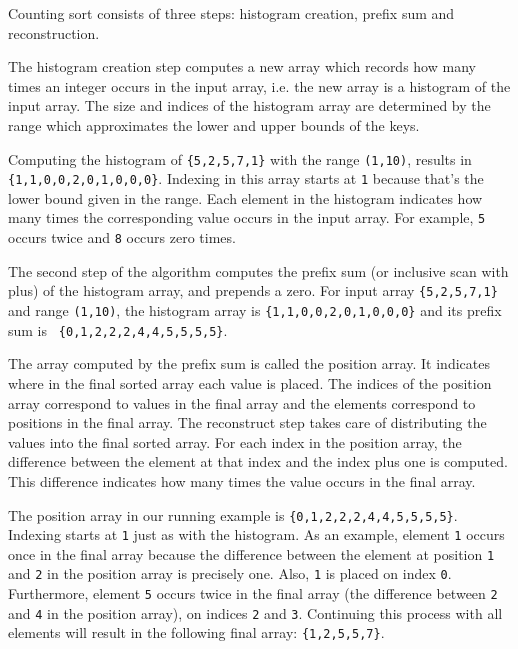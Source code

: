Counting sort consists of three steps: histogram creation, prefix sum
and reconstruction.

The histogram creation step computes a new array which records how
many times an integer occurs in the input array, i.e. the new array is
a histogram of the input array. The size and indices of the histogram
array are determined by the range which approximates the lower and
upper bounds of the keys.

Computing the histogram of \verb!{5,2,5,7,1}! with the range \verb!(1,10)!, 
results in \verb!{1,1,0,0,2,0,1,0,0,0}!.
Indexing in this array
starts at \verb!1! because that's the lower bound given in the
range. Each element in the histogram indicates how many times the
corresponding value occurs in the input array. For example, \verb!5!
occurs twice and \verb!8! occurs zero times.

The second step of the algorithm computes the prefix sum (or inclusive
scan with plus) of the histogram array, and prepends a zero.  For input array
\verb!{5,2,5,7,1}!  and range \verb!(1,10)!, the histogram array is
\verb!{1,1,0,0,2,0,1,0,0,0}! and its prefix sum is {\tt
  \{0,1,2,2,2,4,\allowbreak{}4,5,5,5,5\}}. 


The array computed by the prefix sum is called the position array. It
indicates where in the final sorted array each value is placed. The
indices of the position array correspond to values in the final array
and the elements correspond to positions in the final array. The
reconstruct step takes care of distributing the values into the final
sorted array. For each index in the position array, the difference
between the element at that index and the index plus one is
computed. This difference indicates how many times the value occurs in
the final array.

The position array in our running example is {\tt\{0,1,2,2,2,4,\allowbreak{}4,5,5,5,5\}}.
Indexing starts at \verb!1! just as with the histogram. As an example,
element \verb!1! occurs once in the final array because the
difference between the element at position \verb!1! and \verb!2! in
the position array is precisely one. Also, \verb!1! is placed
on index \verb!0!. Furthermore, element \verb!5! occurs twice in
the final array (the difference between \verb!2! and \verb!4! in the
position array), on indices \verb!2! and \verb!3!. Continuing this
process with all elements will result in the following final array:
\verb!{1,2,5,5,7}!.

